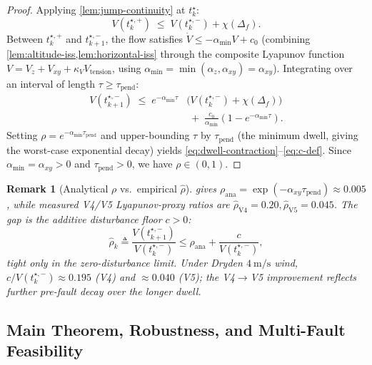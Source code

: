 \documentclass[lettersize,journal]{IEEEtran}
\newtheorem{remark}{Remark}%
\begin{document}
\begin{proof}
Applying \cref{lem:jump-continuity} at $t_k^\star$:
\begin{equation}
  V(t_k^{\star,+}) \;\le\; V(t_k^{\star,-}) + \chi(\Delta_f).
  \label{eq:jump-step}
\end{equation}
Between $t_k^{\star,+}$ and $t_{k+1}^{\star,-}$, the flow
satisfies $\dot V \le -\alpha_{\min} V + c_0$ (combining
\cref{lem:altitude-iss,lem:horizontal-iss} through the
composite Lyapunov function $V = V_z + V_{xy} + \kappa_V
V_{\mathrm{tension}}$, using $\alpha_{\min} =
\min(\alpha_z, \alpha_{xy}) = \alpha_{xy}$). Integrating
over an interval of length $\tau \ge \tau_{\mathrm{pend}}$:
\begin{align}
  V(t_{k+1}^{\star,-})
    \;\le\;
    e^{-\alpha_{\min}\tau}&\bigl(V(t_k^{\star,-})
      + \chi(\Delta_f)\bigr)\\
    &\;+\; \frac{c_0}{\alpha_{\min}}(1 - e^{-\alpha_{\min}\tau}).\nonumber
\end{align}
Setting $\rho = e^{-\alpha_{\min}\tau_{\mathrm{pend}}}$ and
upper-bounding $\tau$ by $\tau_{\mathrm{pend}}$ (the minimum
dwell, giving the worst-case exponential decay) yields
\eqref{eq:dwell-contraction}--\eqref{eq:c-def}.
Since $\alpha_{\min} = \alpha_{xy} > 0$ and
$\tau_{\mathrm{pend}} > 0$, we have $\rho \in (0,1)$.
\end{proof}

\begin{remark}[Analytical $\rho$ vs.\ empirical $\hat\rho$]
\label{rem:rho-gap}
 gives $\rho_{\mathrm{ana}}=\exp(-\alpha_{xy}\tau_{\mathrm{pend}})\approx 0.005$, while measured V4/V5 Lyapunov-proxy ratios are $\hat\rho_{\mathrm{V4}}=0.20,\hat\rho_{\mathrm{V5}}=0.045$. The gap is the additive disturbance floor $c>0$:
\begin{equation}
  \hat\rho_k \triangleq
    \frac{V(t_{k+1}^{\star,-})}{V(t_k^{\star,-})}
    \le \rho_{\mathrm{ana}} + \frac{c}{V(t_k^{\star,-})},
  \label{eq:rho-hat-decomp}
\end{equation}
tight only in the zero-disturbance limit. Under Dryden $\SI{4}{\metre\per\second}$ wind, $c/V(t_k^{\star,-})\approx 0.195$ (V4) and $\approx 0.040$ (V5); the V4$\to$V5 improvement reflects further pre-fault decay over the longer dwell.
\end{remark}

\subsection{Main Theorem, Robustness, and Multi-Fault Feasibility}
\label{sec:main-theorem-and-robustness}
\end{document}
